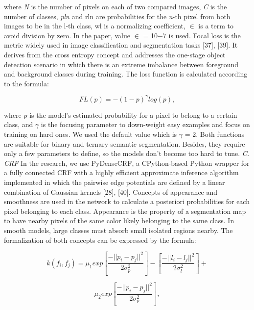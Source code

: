 \documentclass{article}
\begin{document}
\begin{multicols}{2}
where  \textit{N} is the number of pixels on each of two compared images, \textit{C} is the number of classes, \textit{pln} and rln are probabilities for the \textit{n}-th pixel from both images to be in the l-th class, wl is a normalizing coefficient, $\in$ is a term to avoid division by zero. In the paper, value
$\in$ = 10−7 is used.
Focal loss is the metric widely used in image classification and segmentation tasks [37], [39]. It derives from
the cross entropy concept and addresses the one-stage
object detection scenario in which there is an extreme
imbalance between foreground and background classes
during training. The loss function is calculated according
to the formula:
       \vspace{5mm}
\begin{centering}
\begin{equation}
    FL(p) = - (1 - p)^\gamma log(p),
\end{equation}
\end{centering}
where $p$ is the model's estimated probability for a pixel to belong to a certain class, and $\gamma$ is the focusing parameter to down-weight easy examples and focus on training on hard ones. We used the default value which is $\gamma$ = 2.
\columnbreak
Both functions are suitable for binary and ternary semantic segmentation. Besides, they require only a few parameters to define, so the models don't become too hard to tune.
\vspace{3mm}
\textit {C. CRF}
\vspace{2mm}
In the research, we use PyDenseCRF, a CPython-based Python wrapper for a fully connected CRF with a highly efficient approximate inference algorithm implemented in which the pairwise edge potentials are defined by a linear combination of Gaussian kernels [28], [40]. Concepts of appearance and smoothness are used in the network to calculate a posteriori probabilities for each pixel belonging to each class. Appearance is the property of a segmentation map to have nearby pixels of the same color likely belonging to the same class. In smooth models, large classes must absorb small isolated regions nearby. The formalization of both concepts can be expressed by the formula:

\begin{equation}
    k(f_i, f_j) = \mu_1 exp \left[ \frac{-||p_i - p_j||^2}{2 \sigma^2_{p}} \right]  -  \left[  \frac{-||l_i - l_j||^2}{2 \sigma^2_{l}} \right] + 
\end{equation}

\begin{equation}
     \mu_2 exp \left[ \frac{-||p_i - p_j||^2}{2 \sigma^2_{p}} \right],
\end{equation}


\end{multicols}
\end{document}
